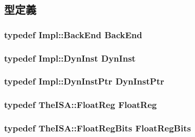 \subsection{型定義}
\hypertarget{classOzoneCPU_a3de526baa0cbb2b55bf669a6f7bf81cc}{
\subsubsection[{BackEnd}]{\setlength{\rightskip}{0pt plus 5cm}typedef Impl::BackEnd {\bf BackEnd}}}
\label{classOzoneCPU_a3de526baa0cbb2b55bf669a6f7bf81cc}
\hypertarget{classOzoneCPU_ab741745c86a14c765b999c11167636d9}{
\subsubsection[{DynInst}]{\setlength{\rightskip}{0pt plus 5cm}typedef Impl::DynInst {\bf DynInst}}}
\label{classOzoneCPU_ab741745c86a14c765b999c11167636d9}
\hypertarget{classOzoneCPU_a028ce10889c5f6450239d9e9a7347976}{
\subsubsection[{DynInstPtr}]{\setlength{\rightskip}{0pt plus 5cm}typedef Impl::DynInstPtr {\bf DynInstPtr}}}
\label{classOzoneCPU_a028ce10889c5f6450239d9e9a7347976}
\hypertarget{classOzoneCPU_a75484259f1855aabc8d74c6eb1cfe186}{
\subsubsection[{FloatReg}]{\setlength{\rightskip}{0pt plus 5cm}typedef TheISA::FloatReg {\bf FloatReg}}}
\label{classOzoneCPU_a75484259f1855aabc8d74c6eb1cfe186}
\hypertarget{classOzoneCPU_aab5eeae86499f9bfe15ef79360eccc64}{
\subsubsection[{FloatRegBits}]{\setlength{\rightskip}{0pt plus 5cm}typedef TheISA::FloatRegBits {\bf FloatRegBits}}}
